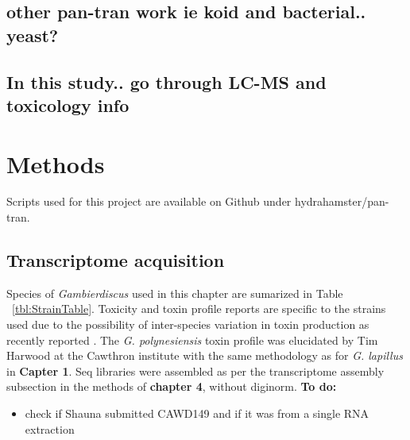 \documentclass[12pt]{article}
\begin{document}
\subsection*{other pan-tran work ie koid and bacterial.. yeast?}

\subsection*{In this study.. go through LC-MS and toxicology info}

\newpage
\section*{Methods}
Scripts used for this project are available on Github under hydrahamster/pan-tran.
\subsection*{Transcriptome acquisition}
Species of \textit{Gambierdiscus} used in this chapter are sumarized in Table ~\ref{tbl:StrainTable}. 
Toxicity and toxin profile reports are specific to the strains used due to the possibility of inter-species variation in toxin production as recently reported \cite{larsson2018toxicology,rhodes2017epiphytic}. 
The \textit{G. polynesiensis} toxin profile was elucidated by Tim Harwood at the Cawthron institute with the same methodology as for \textit{G. lapillus} in \textbf{Capter 1}. 
Seq libraries were assembled as per the transcriptome assembly subsection in the methods of \textbf{chapter 4}, without diginorm. 
\textbf{To do:}
\begin{itemize}
\item check if Shauna submitted CAWD149 and if it was from a single RNA extraction
\end{itemize}
\end{document}
